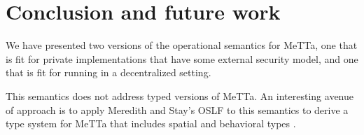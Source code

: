 \section{Conclusion and future work}

We have presented two versions of the operational semantics for MeTTa, one that is fit for private implementations that have some external security model, and one that is fit for running in a decentralized setting.

This semantics does not address typed versions of MeTTa. An interesting avenue of approach is to apply Meredith and Stay's OSLF to this semantics to derive a type system for MeTTa that includes spatial and behavioral types \cite{DBLP:journals/corr/abs-2102-04672}.
